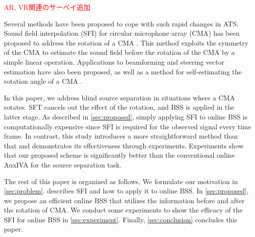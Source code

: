 \documentclass[sip,biber]{now-journal}
\newcommand{\todo}[1]{\textcolor{red}{#1}}
\begin{document}
\todo{AR, VR関連のサーベイ追加}

Several methods have been proposed to cope with such rapid changes in ATS.
Sound field interpolation (SFI) for circular microphone array (CMA) has been proposed to address the rotation of a CMA \cite{Wakabayashi:2023:ASLP}.
This method exploits the symmetry of the CMA to estimate the sound field before the rotation of the CMA by a simple linear operation.
Applications to beamforming \cite{Wakabayashi:2021:ICASSP} and steering vector estimation \cite{Wakabayashi:2021:ASJ:A} have also been proposed,
as well as a method for self-estimating the rotation angle of a CMA \cite{Lian:2021:APSIPA}.

In this paper, we address blind source separation in situations where a CMA rotates.
SFT cancels out the effect of the rotation, and BSS is applied in the latter stage.
As described in \cref{sec:proposed}, simply applying SFI to online BSS is computationally expensive since SFI is required for the observed signal every time frame.
In contrast, this study introduces a more straightforward method than that and demonstrates its effectiveness through experiments.
Experiments show that our proposed scheme is significantly better than the conventional online AuxIVA for the source separation task.

The rest of this paper is organized as follows.
We formulate our motivation in \cref{sec:problem}.
 describes SFI and how to apply it to online BSS.
In \cref{sec:proposed}, we propose an efficient online BSS that utilizes the information before and after the rotation of CMA.
We conduct some experiments to show the efficacy of the SFI for online BSS in \cref{sec:experiment}.
Finally, \cref{sec:conclusion} concludes this paper.
\end{document}
